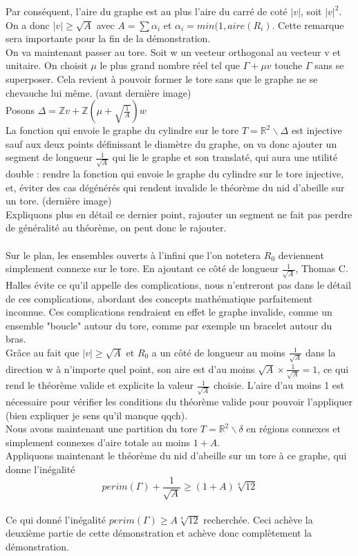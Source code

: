 \documentclass{book}
\begin{document}
\begin{preuve}
Par conséquent, l'aire  du graphe est au plus l'aire du carré de coté $|v|$, soit $|v|^2$.
On a donc $|v| \geq \sqrt{A}$ avec $A = \sum \alpha _i$ et $\alpha _i = min(1, aire(R_i)$.
Cette remarque sera importante pour la fin de la démonstration.\\
On va maintenant passer au tore.
Soit w un vecteur orthogonal au vecteur v et unitaire. On choisit $\mu$ le plus grand nombre réel tel que $\Gamma + \mu v$ touche $\Gamma$ sans se superposer. Cela revient à pouvoir former le tore sans que le graphe ne se chevauche lui même. (avant dernière image)\\
Posons $\Delta = \mathbb{Z}v + \mathbb{Z}(\mu + \sqrt{\frac{1}{A}})w$\\
La fonction qui envoie le graphe du cylindre sur le tore $T = \mathbb{R}^2 \backslash \Delta$ est injective sauf aux deux points définissant le diamètre du graphe, on va donc ajouter un segment de longueur $ \frac{1}{\sqrt{A}} $ qui lie le graphe et son translaté, qui aura une utilité double : rendre la fonction qui envoie le graphe du cylindre sur le tore injective, et, éviter des cas dégénérés qui rendent invalide le théorème du nid d'abeille sur un tore. (dernière image)\\
Expliquons plus en détail ce dernier point, rajouter un segment ne fait pas perdre de généralité au théorème, on peut donc le rajouter.\\\\
Sur le plan, les ensembles ouverts à l'infini que l'on notetera $R_0$ deviennent simplement connexe sur le tore. En ajoutant ce côté de longueur $\frac{1}{\sqrt{A}}$, Thomas C. Halles évite ce qu'il appelle des complications, nous n'entreront pas dans le détail de ces complications, abordant des concepts mathématique parfaitement inconnue. Ces complications rendraient en effet le graphe invalide, comme un ensemble "boucle" autour du tore, comme par exemple un bracelet autour du bras.\\
Grâce au fait que $|v| \geq \sqrt{A}$ et $R_0$ a un côté de longueur au moins $\frac{1}{\sqrt{A}}$ dans la direction w à n'importe quel point, son aire est d'au moins $\sqrt{A} \times \frac{1}{\sqrt{A}} = 1$, ce qui rend le théorème valide et explicite la valeur $\frac{1}{\sqrt{A}}$ choisie. L'aire d'au moins 1 est nécessaire pour vérifier les conditions du théorème valide pour pouvoir l'appliquer (bien expliquer je sens qu'il manque qqch).\\
Nous avons maintenant une partition du tore $T = \mathbb{R}^2 \backslash \delta$ en régions connexes et simplement connexes d'aire totale au moins $1+A$.\\
Appliquons maintenant le théorème du nid d'abeille sur un tore à ce graphe, qui donne l'inégalité 
$$perim (\Gamma) + \frac{1}{\sqrt{A}} \geq  (1+A) \sqrt[4]{12}$$\\
Ce qui donné l'inégalité $ perim(\Gamma) \geq A \sqrt[4]{12} $ recherchée. Ceci achève la deuxième partie de cette démonstration et achève donc complètement la démonstration.
\end{preuve}
\end{document}
